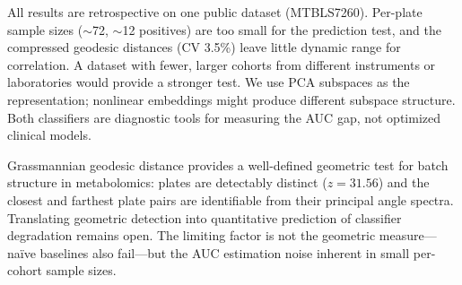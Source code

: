 \documentclass{article}
\begin{document}
All results are retrospective on one public dataset (MTBLS7260). Per-plate sample sizes ($\sim$72, $\sim$12 positives) are too small for the prediction test, and the compressed geodesic distances (CV 3.5\%) leave little dynamic range for correlation. A dataset with fewer, larger cohorts from different instruments or laboratories would provide a stronger test. We use PCA subspaces as the representation; nonlinear embeddings might produce different subspace structure. Both classifiers are diagnostic tools for measuring the AUC gap, not optimized clinical models.

Grassmannian geodesic distance provides a well-defined geometric test for batch structure in metabolomics: plates are detectably distinct ($z = 31.56$) and the closest and farthest plate pairs are identifiable from their principal angle spectra. Translating geometric detection into quantitative prediction of classifier degradation remains open. The limiting factor is not the geometric measure---na\"{i}ve baselines also fail---but the AUC estimation noise inherent in small per-cohort sample sizes.



\end{document}
